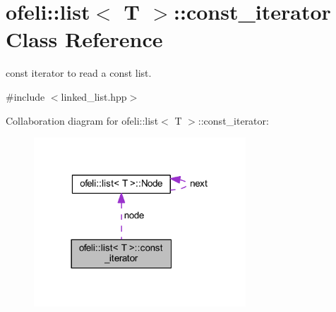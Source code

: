 \hypertarget{classofeli_1_1list_1_1const__iterator}{\section{ofeli\-:\-:list$<$ T $>$\-:\-:const\-\_\-iterator Class Reference}
\label{classofeli_1_1list_1_1const__iterator}
}


const iterator to read a const list.  




{\ttfamily \#include $<$linked\-\_\-list.\-hpp$>$}



Collaboration diagram for ofeli\-:\-:list$<$ T $>$\-:\-:const\-\_\-iterator\-:\nopagebreak
\begin{figure}[H]
\begin{center}
\leavevmode
\includegraphics[width=225pt]{classofeli_1_1list_1_1const__iterator__coll__graph}
\end{center}
\end{figure}
